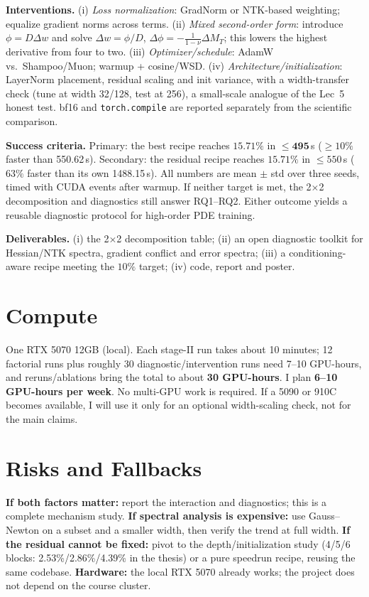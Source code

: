 \documentclass[10pt]{article}
\begin{document}
\textbf{Interventions.} (i) \emph{Loss normalization}: GradNorm or NTK-based weighting; equalize gradient norms across terms. (ii) \emph{Mixed second-order form}: introduce $\phi=D\Delta w$ and solve $\Delta w=\phi/D$, $\Delta\phi=-\tfrac{1}{1-\nu}\Delta M_T$; this lowers the highest derivative from four to two. (iii) \emph{Optimizer/schedule}: AdamW vs.\ Shampoo/Muon; warmup + cosine/WSD. (iv) \emph{Architecture/initialization}: LayerNorm placement, residual scaling and init variance, with a width-transfer check (tune at width 32/128, test at 256), a small-scale analogue of the Lec~5 honest test. bf16 and \texttt{torch.compile} are reported separately from the scientific comparison.

\textbf{Success criteria.} Primary: the best recipe reaches $15.71\%$ in $\le\mathbf{495}$\,s ($\ge10\%$ faster than 550.62\,s). Secondary: the residual recipe reaches $15.71\%$ in $\le550$\,s ($63\%$ faster than its own 1488.15\,s). All numbers are mean $\pm$ std over three seeds, timed with CUDA events after warmup. If neither target is met, the 2$\times$2 decomposition and diagnostics still answer RQ1--RQ2. Either outcome yields a reusable diagnostic protocol for high-order PDE training.

\textbf{Deliverables.} (i) the 2$\times$2 decomposition table; (ii) an open diagnostic toolkit for Hessian/NTK spectra, gradient conflict and error spectra; (iii) a conditioning-aware recipe meeting the $10\%$ target; (iv) code, report and poster.

\section{Compute}

One RTX 5070 12GB (local). Each stage-II run takes about 10 minutes; 12 factorial runs plus roughly 30 diagnostic/intervention runs need 7--10 GPU-hours, and reruns/ablations bring the total to about \textbf{30 GPU-hours}. I plan \textbf{6--10 GPU-hours per week}. No multi-GPU work is required. If a 5090 or 910C becomes available, I will use it only for an optional width-scaling check, not for the main claims.

\section{Risks and Fallbacks}

\textbf{If both factors matter:} report the interaction and diagnostics; this is a complete mechanism study. \textbf{If spectral analysis is expensive:} use Gauss--Newton on a subset and a smaller width, then verify the trend at full width. \textbf{If the residual cannot be fixed:} pivot to the depth/initialization study (4/5/6 blocks: 2.53\%/2.86\%/4.39\% in the thesis) or a pure speedrun recipe, reusing the same codebase. \textbf{Hardware:} the local RTX 5070 already works; the project does not depend on the course cluster.
\end{document}
